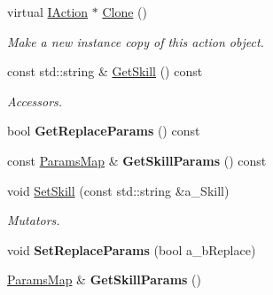 \begin{DoxyCompactItemize}
\mbox{\label{class_use_skill_action_af9abcf631299b6ce3f0a8ade0e71e668}} 
virtual \hyperlink{class_i_action}{I\+Action} $\ast$ \hyperlink{class_use_skill_action_af9abcf631299b6ce3f0a8ade0e71e668}{Clone} ()
\begin{DoxyCompactList}\small\item\em Make a new instance copy of this action object. \end{DoxyCompactList}\item 
\mbox{\label{class_use_skill_action_ada6d34e409f046d1ba0b23212bcb29e1}} 
const std\+::string \& \hyperlink{class_use_skill_action_ada6d34e409f046d1ba0b23212bcb29e1}{Get\+Skill} () const
\begin{DoxyCompactList}\small\item\em Accessors. \end{DoxyCompactList}\item 
\mbox{\label{class_use_skill_action_ac527894dcf69a7c6da9cfe7d6a521467}} 
bool {\bfseries Get\+Replace\+Params} () const
\item 
\mbox{\label{class_use_skill_action_aaa52be37dece71df7285e75f243134f8}} 
const \hyperlink{class_params_map}{Params\+Map} \& {\bfseries Get\+Skill\+Params} () const
\item 
\mbox{\label{class_use_skill_action_aed25ee980739a8a74fd4a08f1b961c4c}} 
void \hyperlink{class_use_skill_action_aed25ee980739a8a74fd4a08f1b961c4c}{Set\+Skill} (const std\+::string \&a\+\_\+\+Skill)
\begin{DoxyCompactList}\small\item\em Mutators. \end{DoxyCompactList}\item 
\mbox{\label{class_use_skill_action_a55cb501de2e17d97d69120935e521432}} 
void {\bfseries Set\+Replace\+Params} (bool a\+\_\+b\+Replace)
\item 
\mbox{\label{class_use_skill_action_a70a89d45e693212abc36e19063c2d8a3}} 
\hyperlink{class_params_map}{Params\+Map} \& {\bfseries Get\+Skill\+Params} ()
\end{DoxyCompactItemize}

